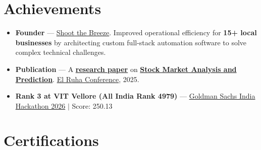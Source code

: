 \documentclass[a4paper,10pt]{article}
\newcommand{\ulink}[2]{\href{#1}{#2}}
\begin{document}
\section{Achievements}
\vspace{2pt}

\begin{itemize}[nosep, leftmargin=1.5em, itemsep=2pt, topsep=2pt]
  \item {\color[HTML]{0A0A0A}\fontsize{11}{14}\selectfont \textbf{Founder} --- \ulink{https://shoot-the-breeze.vercel.app}{Shoot the Breeze}. Improved operational efficiency for \textbf{15+ local businesses} by architecting custom full-stack automation software to solve complex technical challenges.}
  \item {\color[HTML]{0A0A0A}\fontsize{11}{14}\selectfont \textbf{Publication} --- A \ulink{https://www.elruha.org/_files/ugd/614b1f_6b95e1b697bf452b9907ba46e0151c05.pdf\#page=774}{\textbf{research paper}} on \ulink{https://github.com/su-jin1425/Set-Project}{\textbf{Stock Market Analysis and Prediction}}. \ulink{https://www.elruha.org/congress-books}{El Ruha Conference}, 2025.}
  \item {\color[HTML]{0A0A0A}\fontsize{11}{14}\selectfont \textbf{Rank 3 at VIT Vellore (All India Rank 4979)} --- \ulink{https://www.hackerrank.com/contests/goldman-sachs-india-hackathon-2026-cs/leaderboard}{Goldman Sachs India Hackathon 2026} $|$ Score: 250.13}
\end{itemize}

\section{Certifications}
\vspace{2pt}
\end{document}
